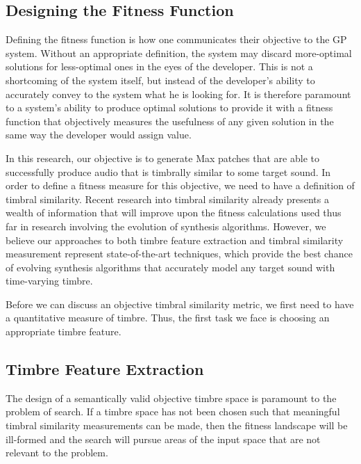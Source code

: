 \documentclass[a4paper,12pt]{report} 	%
\numberwithin{figure}{chapter}
\numberwithin{table}{chapter}
\numberwithin{equation}{chapter}
\begin{document}
\begin{flushleft}
\section{Designing the Fitness Function}

Defining the fitness function is how one communicates their objective to the GP system. Without an appropriate definition, the system may discard more-optimal solutions for less-optimal ones in the eyes of the developer. This is not a shortcoming of the system itself, but instead of the developer's ability to accurately convey to the system what he is looking for. It is therefore paramount to a system's ability to produce optimal solutions to provide it with a fitness function that objectively measures the usefulness of any given solution in the same way the developer would assign value.

In this research, our objective is to generate Max patches that are able to successfully produce audio that is timbrally similar to some target sound. In order to define a fitness measure for this objective, we need to have a definition of timbral similarity. Recent research into timbral similarity already presents a wealth of information that will improve upon the fitness calculations used thus far in research involving the evolution of synthesis algorithms. However, we believe our approaches to both timbre feature extraction and timbral similarity measurement represent state-of-the-art techniques, which provide the best chance of evolving synthesis algorithms that accurately model any target sound with time-varying timbre.

Before we can discuss an objective timbral similarity metric, we first need to have a quantitative measure of timbre. Thus, the first task we face is choosing an appropriate timbre feature.

\subsection{Timbre Feature Extraction}

The design of a semantically valid objective timbre space is paramount to the problem of search. If a timbre space has not been chosen such that meaningful timbral similarity measurements can be made, then the fitness landscape will be ill-formed and the search will pursue areas of the input space that are not relevant to the problem.


\end{flushleft}
\end{document}

